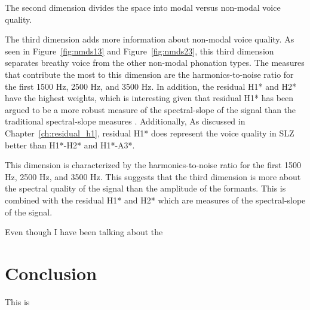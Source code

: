 The second dimension divides the space into modal versus non-modal voice quality.

The third dimension adds more information about non-modal voice quality. As seen in Figure~\ref{fig:nmds13} and Figure~\ref{fig:nmds23}, this third dimension separates breathy voice from the other non-modal phonation types. The measures that contribute the most to this dimension are the harmonics-to-noise ratio for the first 1500 Hz, 2500 Hz, and 3500 Hz. In addition, the residual H1* and H2* have the highest weights, which is interesting given that residual H1* has been argued to be a more robust measure of the spectral-slope of the signal than the traditional spectral-slope measures \citep{chaiH1H2Acoustic2022,brinkerhoffResidualH1Measure2024}. Additionally, As discussed in Chapter~\ref{ch:residual_h1}, residual H1* does represent the voice quality in SLZ better than H1*-H2* and H1*-A3*.

This dimension is characterized by the harmonics-to-noise ratio for the first 1500 Hz, 2500 Hz, and 3500 Hz. This suggests that the third dimension is more about the spectral quality of the signal than the amplitude of the formants. This is combined with the residual H1* and H2* which are measures of the spectral-slope of the signal.

Even though I have been talking about the 

\section{Conclusion} \label{sec:acousticlandscape:conclusion}

This is 